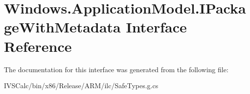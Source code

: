 \hypertarget{interface_windows_1_1_application_model_1_1_i_package_with_metadata}{}\section{Windows.\+Application\+Model.\+I\+Package\+With\+Metadata Interface Reference}
\label{interface_windows_1_1_application_model_1_1_i_package_with_metadata}


The documentation for this interface was generated from the following file\+:\begin{DoxyCompactItemize}
\item 
I\+V\+S\+Calc/bin/x86/\+Release/\+A\+R\+M/ilc/Safe\+Types.\+g.\+cs\end{DoxyCompactItemize}
